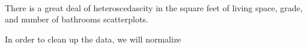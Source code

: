 \documentclass[11pt]{article}
\begin{document}
    \begin{center}
    \end{center}
    { \hspace*{\fill} \\}
    
    \begin{center}
    \end{center}
    { \hspace*{\fill} \\}
    
    \begin{center}
    \end{center}
    { \hspace*{\fill} \\}
    
    \begin{center}
    \end{center}
    { \hspace*{\fill} \\}
    
    \begin{center}
    \end{center}
    { \hspace*{\fill} \\}
    
    \begin{center}
    \end{center}
    { \hspace*{\fill} \\}
    
    There is a great deal of heteroscedascity in the square feet of living
space, grade, and number of bathrooms scatterplots.

In order to clean up the data, we will normalize
\end{document}
